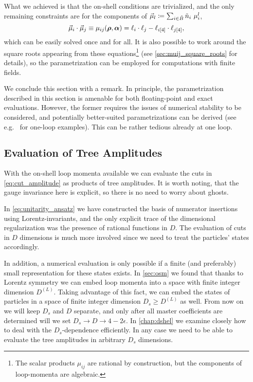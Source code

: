 What we achieved is that the on-shell conditions are trivialized,
and the only remaining constraints are for the components of $\va{\mu}_l \coloneqq \sum_{i\in \tilde{B}} \tilde{n}_i~\mu^l_{i}$,
\begin{equation}
  \va{\mu}_i \cdot \va{\mu}_j  \equiv  \mu_{ij} (\vb*{\rho},\vb*{\alpha}) = \ell_i\cdot \ell_j - \ell_{i[4]}\cdot \ell_{j[4]},
\end{equation}
which can be easily solved once and for all.
It is also possible to work around the square roots appearing from these equations\footnote{
  The scalar products $\mu_{ij}$ are rational by construction, but the components of loop-momenta are algebraic.
} (see \cref{sec:muij_square_roots} for details),
so the parametrization can be employed for computations with finite fields.

We conclude this section with a remark.
In principle, the parametrization described in this
section is amenable for both floating-point and exact evaluations.
However, the former requires the issues of numerical stability to be considered,
and potentially better-suited parametrizations can be derived (see e.g.\ \cite{Kilgore:2007qr,Berger:2008sj} for one-loop examples).
This can be rather tedious already at one loop.

\subsection{Evaluation of Tree Amplitudes}
\label{sec:evaluation_of_tree_amplitudes}

With the on-shell loop momenta available
we can evaluate the cuts in \cref{eq:cut_amplitude} as products
of tree amplitudes. It is worth noting, that the gauge invariance here is explicit, so 
there is no need to worry about ghosts.

In \cref{eq:unitarity_ansatz} we have constructed  the basis of numerator insertions using Lorentz-invariants, and
the only explicit trace of the dimensional regularization was the presence of rational functions in $D$.
The evaluation of cuts in $D$ dimensions is much more involved since we need to treat the particles' states accordingly.

In addition, a numerical evaluation is only possible if a finite (and preferably) small representation for these states exists.
In \cref{sec:osm} we found that thanks to Lorentz symmetry we can embed loop
momenta into a space with finite integer dimension $D^{(L)}$.
Taking advantage of this fact, we can embed the states of particles in a space of finite integer dimension $D_s\geq D^{(L)}$ as well.
From now on we will keep $D_s$ and $D$ separate,
and only after all master coefficients are determined will we set $D_s\to D\to 4-2\epsilon$.
In \cref{chap:dshel} we examine closely how to deal with the $D_s$-dependence efficiently.
In any case we need to be able to evaluate the tree amplitudes in arbitrary $D_s$ dimensions.

